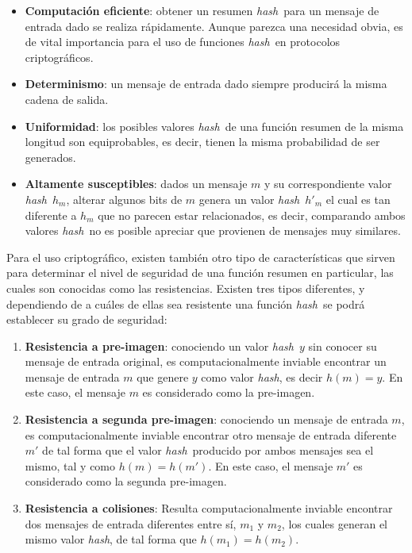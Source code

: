 \documentclass[12pt,spanish,listoffigures,listoftables,listofalgorithms]{tfgetsinf}
\newcommand{\hash}{\textit{hash}}
\begin{document}
\begin{itemize}

	\item \textbf{Computación eficiente}: obtener un resumen \hash~para un mensaje de entrada dado se realiza rápidamente. Aunque parezca una necesidad obvia, es de vital importancia para el uso de funciones \hash~en protocolos criptográficos.

    \item \textbf{Determinismo}: un mensaje de entrada dado siempre producirá la misma cadena de salida.

    \item \textbf{Uniformidad}: los posibles valores \hash~de una función resumen de la misma longitud son equiprobables, es decir, tienen la misma probabilidad de ser generados.

    \item \textbf{Altamente susceptibles}: dados un mensaje $m$ y su correspondiente valor \hash~$h_m$, alterar algunos bits de $m$ genera un valor \hash~$h'_m$ el cual es tan diferente a $h_m$ que no parecen estar relacionados, es decir, comparando ambos valores \hash~no es posible apreciar que provienen de mensajes muy similares.

\end{itemize}

Para el uso criptográfico, existen también otro tipo de características que sirven para determinar el nivel de seguridad de una función resumen en particular, las cuales son conocidas como las resistencias. Existen tres tipos diferentes, y dependiendo de a cuáles de ellas sea resistente una función \hash~se podrá establecer su grado de seguridad:

\begin{enumerate}

	\item \textbf{Resistencia a pre-imagen}: conociendo un valor \hash~$y$ sin conocer su mensaje de entrada original, es computacionalmente inviable encontrar un mensaje de entrada $m$ que genere $y$ como valor \hash, es decir $h(m) = y$. En este caso, el mensaje $m$ es considerado como la pre-imagen.
 
	\item \textbf{Resistencia a segunda pre-imagen}: conociendo un mensaje de entrada $m$, es computacionalmente inviable encontrar otro mensaje de entrada diferente $m'$ de tal forma que el valor \hash~producido por ambos mensajes sea el mismo, tal y como $h(m) = h(m')$. En este caso, el mensaje $m'$ es considerado como la segunda pre-imagen.

	\item \textbf{Resistencia a colisiones}: Resulta computacionalmente inviable encontrar dos mensajes de entrada diferentes entre sí, $m_1$ y $m_2$, los cuales generan el mismo valor \hash, de tal forma que $h(m_1) = h(m_2)$.

\end{enumerate}
\end{document}
